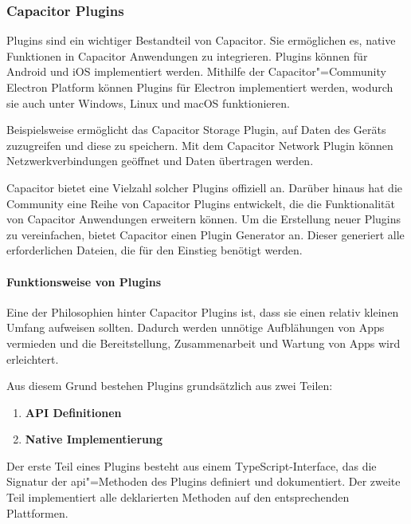 \subsubsection{Capacitor Plugins}

Plugins sind ein wichtiger Bestandteil von Capacitor.
Sie ermöglichen es, native Funktionen in Capacitor Anwendungen zu integrieren.
Plugins können für Android und iOS implementiert werden.
Mithilfe der Capacitor"=Community Electron Platform können Plugins für Electron implementiert werden, wodurch sie auch unter Windows, Linux und macOS funktionieren.
\cite{capacitor:docs, capacitor-electron}

Beispielsweise ermöglicht das Capacitor Storage Plugin, auf Daten des Geräts zuzugreifen und diese zu speichern.
Mit dem Capacitor Network Plugin können Netzwerkverbindungen geöffnet und Daten übertragen werden.
\cite{capacitor:plugins}

Capacitor bietet eine Vielzahl solcher Plugins offiziell an.
Darüber hinaus hat die Community eine Reihe von Capacitor Plugins entwickelt, die die Funktionalität von Capacitor Anwendungen erweitern können.
Um die Erstellung neuer Plugins zu vereinfachen, bietet Capacitor einen Plugin Generator an.
Dieser generiert alle erforderlichen Dateien, die für den Einstieg benötigt werden.
\cite{capacitor:docs}

\newpage

\paragraph{Funktionsweise von Plugins}

Eine der Philosophien hinter Capacitor Plugins ist, dass sie einen relativ kleinen Umfang aufweisen sollten.
Dadurch werden unnötige Aufblähungen von Apps vermieden und die Bereitstellung, Zusammenarbeit und Wartung von Apps wird erleichtert.
\cite{capacitor:docs}

Aus diesem Grund bestehen Plugins grundsätzlich aus zwei Teilen:

\begin{enumerate}
    \setlength\itemsep{-0.8em}
    \item \textbf{API Definitionen} 
    \item \textbf{Native Implementierung}
\end{enumerate}

Der erste Teil eines Plugins besteht aus einem TypeScript-Interface, das die Signatur der \acs{api}"=Methoden des Plugins definiert und dokumentiert.
Der zweite Teil implementiert alle deklarierten Methoden auf den entsprechenden Plattformen.
\cite{capacitor:docs}

